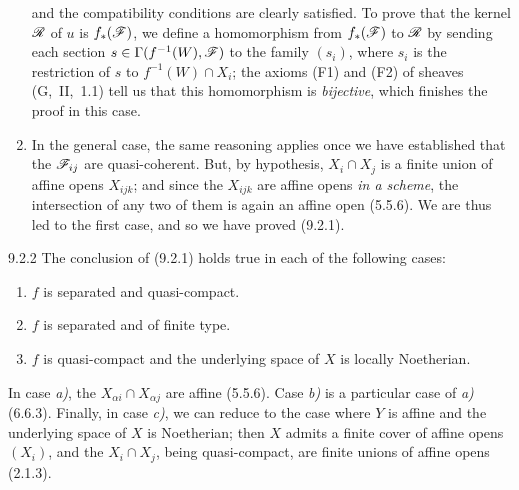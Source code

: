 \documentclass[../main.tex]{subfiles}
\begin{document}
\begin{enumerate}[label=\alph*)]
        and the compatibility conditions are clearly satisfied.
        To prove that the kernel $\mathscr{R}$ of $u$ is $f_*(\mathscr{F})$, we define a homomorphism from $f_*(\mathscr{F})$ to $\mathscr{R}$ by sending each section $s\in\Gamma(f^{-1}(W), \mathscr{F})$ to the family $(s_i)$, where $s_i$ is the restriction of $s$ to $f^{-1}(W)\cap X_i$; the axioms (F1) and (F2) of sheaves (G,~II,~1.1) tell us that this homomorphism is \emph{bijective}, which finishes the proof in this case.
    \item In the general case, the same reasoning applies once we have established that the $\mathscr{F}_{ij}$ are quasi-coherent.
    But, by hypothesis, $X_i\cap X_j$ is a finite union of affine opens $X_{ijk}$; and since the $X_{ijk}$ are affine opens \emph{in a scheme}, the intersection of any two of them is again an affine open (5.5.6).
    We are thus led to the first case, and so we have proved (9.2.1).
\end{enumerate}

\begin{cx}[Corollary]{9.2.2}
    The conclusion of {\normalfont(9.2.1)} holds true in each of the following cases:
    \begin{enumerate}[label=\alph*)]
        \item $f$ is separated and quasi-compact.
        \item $f$ is separated and of finite type.
        \item $f$ is quasi-compact and the underlying space of $X$ is locally Noetherian.
    \end{enumerate}
\end{cx}

In case \emph{a)}, the $X_{\alpha i}\cap X_{\alpha j}$ are affine (5.5.6).
Case \emph{b)} is a particular case of \emph{a)} (6.6.3).
Finally, in case \emph{c)}, we can reduce to the case where $Y$ is affine and the underlying space of $X$ is Noetherian; then $X$ admits a finite cover of affine opens $(X_i)$, and the $X_i\cap X_j$, being quasi-compact, are finite unions of affine opens (2.1.3).
\end{document}
